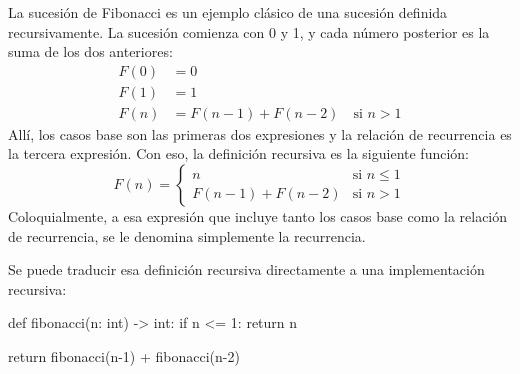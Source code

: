 La sucesión de Fibonacci es un ejemplo clásico de una sucesión definida recursivamente. La sucesión comienza con 0 y 1, y cada número posterior es la suma de los dos anteriores:
\begin{align*}
    F(0) &= 0 \\
    F(1) &= 1 \\
    F(n) &= F(n-1) + F(n-2) \quad \text{si } n > 1
\end{align*}
Allí, los casos base son las primeras dos expresiones y la relación de recurrencia es la tercera expresión. Con eso, la definición recursiva es la siguiente función:
\[F(n) = \begin{cases}
  n & \text{si } n \leq 1 \\
  F(n-1) + F(n-2) & \text{si } n > 1
\end{cases}\]
Coloquialmente, a esa expresión que incluye tanto los casos base como la relación de recurrencia, se le denomina simplemente la recurrencia. 

Se puede traducir esa definición recursiva directamente a una implementación recursiva:
\begin{codeblock}
\begin{pseudocode}
def fibonacci(n: int) -> int:
    if n <= 1: return n

    return fibonacci(n-1) + fibonacci(n-2)
\end{pseudocode}
\end{codeblock}

